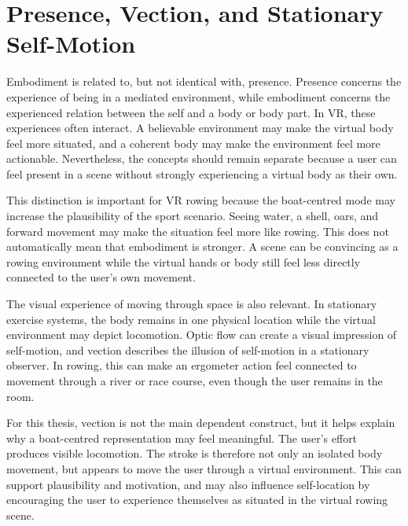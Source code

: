 \section{Presence, Vection, and Stationary Self-Motion}
\label{sec:background_presence_vection_stationary_motion}

Embodiment is related to, but not identical with, presence. Presence concerns the experience of being in a mediated environment, while embodiment concerns the experienced relation between the self and a body or body part. In VR, these experiences often interact. A believable environment may make the virtual body feel more situated, and a coherent body may make the environment feel more actionable. Nevertheless, the concepts should remain separate because a user can feel present in a scene without strongly experiencing a virtual body as their own.

This distinction is important for VR rowing because the boat-centred mode may increase the plausibility of the sport scenario. Seeing water, a shell, oars, and forward movement may make the situation feel more like rowing. This does not automatically mean that embodiment is stronger. A scene can be convincing as a rowing environment while the virtual hands or body still feel less directly connected to the user's own movement.

The visual experience of moving through space is also relevant. In stationary exercise systems, the body remains in one physical location while the virtual environment may depict locomotion. Optic flow can create a visual impression of self-motion, and vection describes the illusion of self-motion in a stationary observer. In rowing, this can make an ergometer action feel connected to movement through a river or race course, even though the user remains in the room.

For this thesis, vection is not the main dependent construct, but it helps explain why a boat-centred representation may feel meaningful. The user's effort produces visible locomotion. The stroke is therefore not only an isolated body movement, but appears to move the user through a virtual environment. This can support plausibility and motivation, and may also influence self-location by encouraging the user to experience themselves as situated in the virtual rowing scene.

